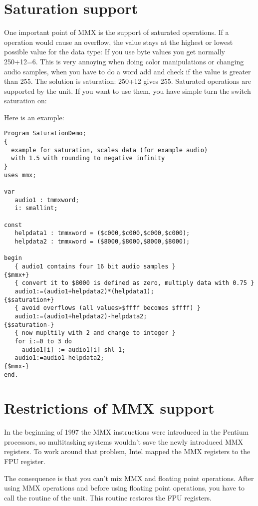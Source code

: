 \section{Saturation support}
\label{se:SaturationSupport}

One important point of MMX is the support of saturated operations.
If a operation would cause an overflow, the value stays at the
highest or lowest possible value for the data type:
If you use byte values you get normally 250+12=6. This is very
annoying when doing color manipulations or changing audio samples,
when you have to do a word add and check if the value is greater than
255. The solution is saturation: 250+12 gives 255.
Saturated operations are supported by the  unit. If you
want to use them, you have simple turn the switch saturation on:

Here is an example:
\begin{verbatim}
Program SaturationDemo;
{
  example for saturation, scales data (for example audio)
  with 1.5 with rounding to negative infinity
}
uses mmx;

var
   audio1 : tmmxword;
   i: smallint;

const
   helpdata1 : tmmxword = ($c000,$c000,$c000,$c000);
   helpdata2 : tmmxword = ($8000,$8000,$8000,$8000);

begin
   { audio1 contains four 16 bit audio samples }
{$mmx+}
   { convert it to $8000 is defined as zero, multiply data with 0.75 }
   audio1:=(audio1+helpdata2)*(helpdata1);
{$saturation+}
   { avoid overflows (all values>$ffff becomes $ffff) }
   audio1:=(audio1+helpdata2)-helpdata2;
{$saturation-}
   { now mupltily with 2 and change to integer }
   for i:=0 to 3 do
     audio1[i] := audio1[i] shl 1;
   audio1:=audio1-helpdata2;
{$mmx-}
end.
\end{verbatim}

\section{Restrictions of MMX support}
\label{se:MMXrestrictions}

In the beginning of 1997 the MMX instructions were introduced in the
Pentium processors, so multitasking systems wouldn't save the
newly introduced MMX registers. To work around that problem, Intel
mapped the MMX registers to the FPU register.

The consequence is that
you can't mix MMX and floating point operations. After using
MMX operations and before using floating point operations, you
have to call the routine  of the  unit.
This routine restores the FPU registers.

